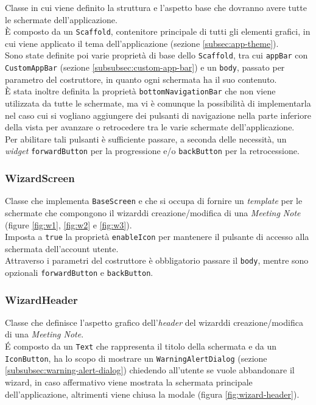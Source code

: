 Classe in cui viene definito la struttura e l'aspetto base che dovranno avere tutte le schermate dell'applicazione.\\
È composto da un \lstinline{Scaffold}\cite{site:scaffold}, contenitore principale di tutti gli elementi grafici, in cui viene applicato il tema dell'applicazione (sezione \ref{subsec:app-theme}). \\
Sono state definite poi varie proprietà di base dello \lstinline{Scaffold}, tra cui \lstinline{appBar} con \lstinline{CustomAppBar} (sezione \ref{subsubsec:custom-app-bar}) e un \lstinline{body}, passato per parametro del costruttore, in quanto ogni schermata ha il suo contenuto.\\
È stata inoltre definita la proprietà \lstinline{bottomNavigationBar} che non viene utilizzata da tutte le schermate, ma vi è comunque la possibilità di implementarla nel caso cui si vogliano aggiungere dei pulsanti di navigazione nella parte inferiore della vista per avanzare o retrocedere tra le varie schermate dell'applicazione.\\
Per abilitare tali pulsanti è sufficiente passare, a seconda delle necessità, un \emph{widget} \lstinline{forwardButton} per la progressione e/o \lstinline{backButton} per la retrocessione.

\subsubsection*{WizardScreen}
\label{subsubsec:wizard-screen}

Classe che implementa \lstinline{BaseScreen} e che si occupa di fornire un \emph{template} per le schermate che compongono il \gls{wizard}\glsoccur di creazione/modifica di una \emph{Meeting Note} (figure \ref{fig:w1}, \ref{fig:w2} e \ref{fig:w3}).\\
Imposta a \lstinline{true} la proprietà \lstinline{enableIcon} per mantenere il pulsante di accesso alla schermata dell'account utente.\\
Attraverso i parametri del costruttore è obbligatorio passare il \lstinline{body}, mentre sono opzionali \lstinline{forwardButton} e \lstinline{backButton}.

\subsubsection*{WizardHeader}
\label{subsubsec:wizard-header}

Classe che definisce l'aspetto grafico dell'\emph{header} del \gls{wizard}\glsoccur di creazione/modifica di una \emph{Meeting Note}.\\
É composto da un \lstinline{Text}\cite{site:text} che rappresenta il titolo della schermata e da un \lstinline{IconButton}\cite{site:icon-button}, ha lo scopo di mostrare un \lstinline{WarningAlertDialog} (sezione \ref{subsubsec:warning-alert-dialog}) chiedendo all'utente se vuole abbandonare il \gls{wizard}\glsoccur, in caso affermativo viene mostrata la schermata principale dell'applicazione, altrimenti viene chiusa la modale (figura \ref{fig:wizard-header}). 

